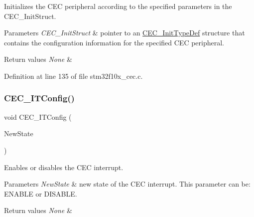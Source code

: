 Initializes the C\+EC peripheral according to the specified parameters in the C\+E\+C\+\_\+\+Init\+Struct. 


\begin{DoxyParams}{Parameters}
{\em C\+E\+C\+\_\+\+Init\+Struct} & pointer to an \hyperlink{struct_c_e_c___init_type_def}{C\+E\+C\+\_\+\+Init\+Type\+Def} structure that contains the configuration information for the specified C\+EC peripheral. \\
\hline
\end{DoxyParams}

\begin{DoxyRetVals}{Return values}
{\em None} & \\
\hline
\end{DoxyRetVals}


Definition at line 135 of file stm32f10x\+\_\+cec.\+c.

\mbox{\label{group___c_e_c___exported___functions_ga8be87c514505cf82eb29334f054fc0bc}} 
\subsubsection{\texorpdfstring{C\+E\+C\+\_\+\+I\+T\+Config()}{CEC\_ITConfig()}}
{\footnotesize\ttfamily void C\+E\+C\+\_\+\+I\+T\+Config (\begin{DoxyParamCaption}\item[{\hyperlink{group___exported__types_gac9a7e9a35d2513ec15c3b537aaa4fba1}{Functional\+State}}]{New\+State }\end{DoxyParamCaption})}



Enables or disables the C\+EC interrupt. 


\begin{DoxyParams}{Parameters}
{\em New\+State} & new state of the C\+EC interrupt. This parameter can be\+: E\+N\+A\+B\+LE or D\+I\+S\+A\+B\+LE. \\
\hline
\end{DoxyParams}

\begin{DoxyRetVals}{Return values}
{\em None} & \\
\hline
\end{DoxyRetVals}


